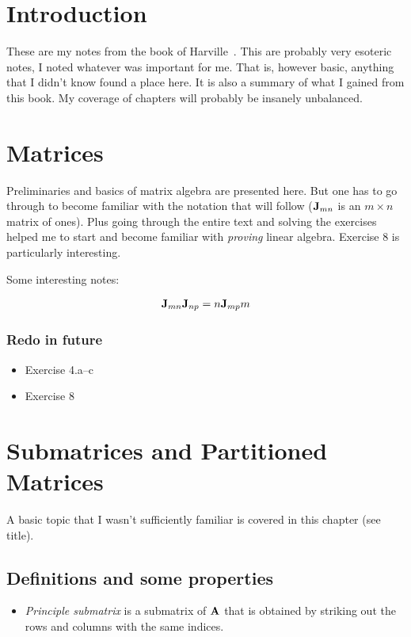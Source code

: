 \documentclass[a4paper, oneside]{book}
\begin{document}
\chapter*{Introduction}

These are my notes from the book of Harville~\cite{harville97}. This are probably very esoteric notes, I noted whatever was important for me. That is, however basic, anything that I didn't know found a place here. It is also a summary of what I gained from this book. My coverage of chapters will probably be insanely unbalanced.

\chapter{Matrices}
Preliminaries and basics of matrix algebra are presented here. But one has to go through to become familiar with the notation that will follow (\eg $\mathbf{J}_{mn}$ is an $m\times n$ matrix of ones). Plus going through the entire text and solving the exercises helped me to start and become familiar with \textit{proving} linear algebra. Exercise 8 is particularly interesting.

Some interesting notes:

\begin{align*}
\mathbf{J}_{mn} \mathbf{J}_{np} = n \mathbf{J}_{mp}m
\end{align*}

\subsection{Redo in future}
\begin{itemize}
\item Exercise 4.a--c
\item Exercise 8
\end{itemize}

\chapter{Submatrices and Partitioned Matrices}
A basic topic that I wasn't sufficiently familiar is covered in this chapter (see title). 

\section{Definitions and some properties}
\begin{itemize}
\item \textit{Principle submatrix} is a submatrix of $\mathbf A$ that is obtained by striking out the rows and columns with the same indices.
\end{itemize}
\end{document}
